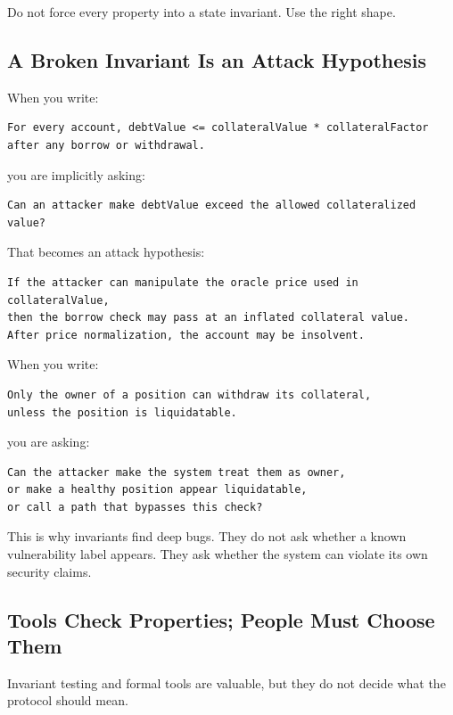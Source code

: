 Do not force every property into a state invariant. Use the right shape.

\subsection{A Broken Invariant Is an Attack Hypothesis}

When you write:

\begin{lstlisting}
For every account, debtValue <= collateralValue * collateralFactor
after any borrow or withdrawal.
\end{lstlisting}

you are implicitly asking:

\begin{lstlisting}
Can an attacker make debtValue exceed the allowed collateralized value?
\end{lstlisting}

That becomes an attack hypothesis:

\begin{lstlisting}
If the attacker can manipulate the oracle price used in collateralValue,
then the borrow check may pass at an inflated collateral value.
After price normalization, the account may be insolvent.
\end{lstlisting}

When you write:

\begin{lstlisting}
Only the owner of a position can withdraw its collateral,
unless the position is liquidatable.
\end{lstlisting}

you are asking:

\begin{lstlisting}
Can the attacker make the system treat them as owner,
or make a healthy position appear liquidatable,
or call a path that bypasses this check?
\end{lstlisting}

This is why invariants find deep bugs. They do not ask whether a known
vulnerability label appears. They ask whether the system can violate its
own security claims.

\subsection{Tools Check Properties; People Must Choose Them}

Invariant testing and formal tools are valuable, but they do not decide
what the protocol should mean.

